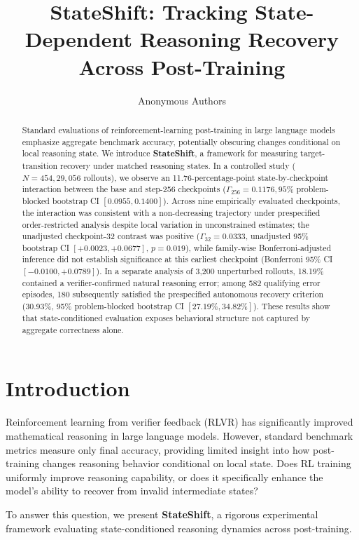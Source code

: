 \documentclass[11pt]{article}
\title{StateShift: Tracking State-Dependent Reasoning Recovery Across Post-Training}
\author{Anonymous Authors}
\date{}
\begin{document}
\maketitle

\begin{abstract}
Standard evaluations of reinforcement-learning post-training in large language models emphasize aggregate benchmark accuracy, potentially obscuring changes conditional on local reasoning state. We introduce \textbf{StateShift}, a framework for measuring target-transition recovery under matched reasoning states. In a controlled study ($N=454, 29,056$ rollouts), we observe an 11.76-percentage-point state-by-checkpoint interaction between the base and step-256 checkpoints ($\Gamma_{256}=0.1176, 95\%$ problem-blocked bootstrap CI $[0.0955, 0.1400]$). Across nine empirically evaluated checkpoints, the interaction was consistent with a non-decreasing trajectory under prespecified order-restricted analysis despite local variation in unconstrained estimates; the unadjusted checkpoint-32 contrast was positive ($\Gamma_{32}=0.0333$, unadjusted 95\% bootstrap CI $[+0.0023, +0.0677]$, $p=0.019$), while family-wise Bonferroni-adjusted inference did not establish significance at this earliest checkpoint (Bonferroni 95\% CI $[-0.0100, +0.0789]$). In a separate analysis of 3,200 unperturbed rollouts, 18.19\% contained a verifier-confirmed natural reasoning error; among 582 qualifying error episodes, 180 subsequently satisfied the prespecified autonomous recovery criterion (30.93\%, 95\% problem-blocked bootstrap CI $[27.19\%, 34.82\%]$). These results show that state-conditioned evaluation exposes behavioral structure not captured by aggregate correctness alone.
\end{abstract}

\section{Introduction}
Reinforcement learning from verifier feedback (RLVR) has significantly improved mathematical reasoning in large language models. However, standard benchmark metrics measure only final accuracy, providing limited insight into how post-training changes reasoning behavior conditional on local state. Does RL training uniformly improve reasoning capability, or does it specifically enhance the model's ability to recover from invalid intermediate states?

To answer this question, we present \textbf{StateShift}, a rigorous experimental framework evaluating state-conditioned reasoning dynamics across post-training.
\end{document}
